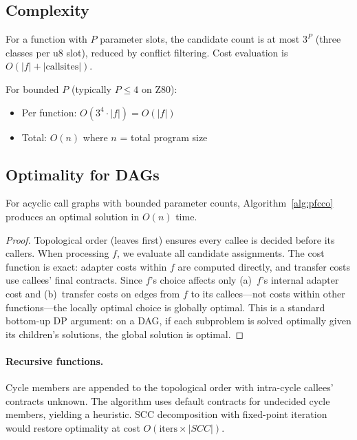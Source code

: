 \documentclass[sigplan,screen,nonacm]{acmart}
\begin{document}
\subsection{Complexity}

For a function with $P$ parameter slots, the candidate count is at most
$3^P$ (three classes per u8 slot), reduced by conflict filtering.  Cost
evaluation is $O(|f| + |\text{callsites}|)$.

For bounded $P$ (typically $P \le 4$ on Z80):
\begin{itemize}
\item Per function: $O(3^4 \cdot |f|) = O(|f|)$
\item Total: $O(n)$ where $n$ = total program size
\end{itemize}

\subsection{Optimality for DAGs}

\begin{theorem}
For acyclic call graphs with bounded parameter counts,
Algorithm~\ref{alg:pfcco} produces an optimal solution in $O(n)$ time.
\end{theorem}

\begin{proof}
Topological order (leaves first) ensures every callee is decided before its
callers.  When processing $f$, we evaluate all candidate assignments.  The
cost function is exact: adapter costs within $f$ are computed directly, and
transfer costs use callees' final contracts.  Since $f$'s choice affects
only (a)~$f$'s internal adapter cost and (b)~transfer costs on edges from
$f$ to its callees---not costs within other functions---the locally optimal
choice is globally optimal.  This is a standard bottom-up DP argument: on a
DAG, if each subproblem is solved optimally given its children's solutions,
the global solution is optimal.
\end{proof}

\paragraph{Recursive functions.}
Cycle members are appended to the topological order with intra-cycle
callees' contracts unknown.  The algorithm uses default contracts for
undecided cycle members, yielding a heuristic.  SCC decomposition with
fixed-point iteration would restore optimality at cost
$O(\text{iters} \times |SCC|)$.
\end{document}
